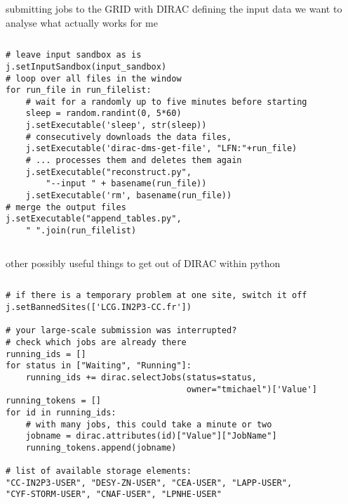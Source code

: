 \documentclass{beamer}
\begin{document}
\begin{frame}[fragile]{submitting jobs to the GRID with DIRAC}
                      {defining the input data we want to analyse}
    what actually works for me
    \begin{columns}
        \begin{lstlisting}[basicstyle=\scriptsize,firstnumber=37]
# leave input sandbox as is
j.setInputSandbox(input_sandbox)
# loop over all files in the window
for run_file in run_filelist:
    # wait for a randomly up to five minutes before starting
    sleep = random.randint(0, 5*60)
    j.setExecutable('sleep', str(sleep))
    # consecutively downloads the data files,
    j.setExecutable('dirac-dms-get-file', "LFN:"+run_file)
    # ... processes them and deletes them again
    j.setExecutable("reconstruct.py",
        "--input " + basename(run_file))
    j.setExecutable('rm', basename(run_file))
# merge the output files
j.setExecutable("append_tables.py",
    " ".join(run_filelist)
        \end{lstlisting}
    \end{columns}
\end{frame}



\begin{frame}[fragile]{other possibly useful things}
    {to get out of DIRAC within python}
    \begin{columns}
        \begin{lstlisting}[basicstyle=\scriptsize,numbers=none]
# if there is a temporary problem at one site, switch it off
j.setBannedSites(['LCG.IN2P3-CC.fr'])

# your large-scale submission was interrupted?
# check which jobs are already there
running_ids = []
for status in ["Waiting", "Running"]:
    running_ids += dirac.selectJobs(status=status,
                                    owner="tmichael")['Value']
running_tokens = []
for id in running_ids:
    # with many jobs, this could take a minute or two
    jobname = dirac.attributes(id)["Value"]["JobName"]
    running_tokens.append(jobname)

# list of available storage elements:
"CC-IN2P3-USER", "DESY-ZN-USER", "CEA-USER", "LAPP-USER",
"CYF-STORM-USER", "CNAF-USER", "LPNHE-USER"
        \end{lstlisting}
    \end{columns}
\end{frame}
\end{document}
